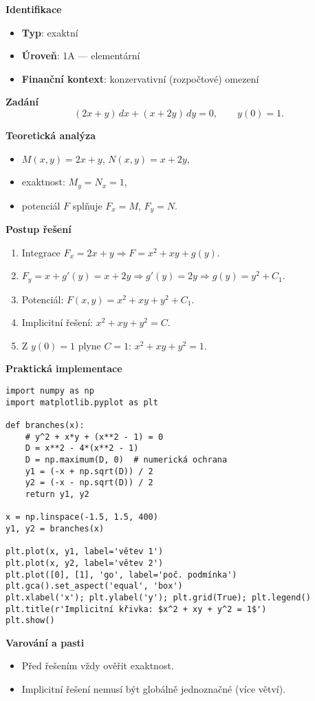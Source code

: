 \begin{example}
\label{ex:1a6}

\textbf{Identifikace}
\begin{itemize}
\item \textbf{Typ}: exaktní
\item \textbf{Úroveň}: 1A — elementární
\item \textbf{Finanční kontext}: konzervativní (rozpočtové) omezení
\end{itemize}

\textbf{Zadání}
\[
(2x+y)\,dx + (x+2y)\,dy = 0, \qquad y(0)=1.
\]

\textbf{Teoretická analýza}
\begin{itemize}
\item $M(x,y)=2x+y$, $N(x,y)=x+2y$,
\item exaktnost: $M_y=N_x=1$,
\item potenciál $F$ splňuje $F_x=M$, $F_y=N$.
\end{itemize}

\textbf{Postup řešení}
\begin{enumerate}
\item Integrace $F_x=2x+y \Rightarrow F=x^2+xy+g(y)$.
\item $F_y = x + g'(y) = x + 2y \Rightarrow g'(y)=2y \Rightarrow g(y)=y^2 + C_1$.
\item Potenciál: $F(x,y)=x^2+xy+y^2 + C_1$.
\item Implicitní řešení: $x^2+xy+y^2 = C$.
\item Z $y(0)=1$ plyne $C=1$: $x^2+xy+y^2=1$.
\end{enumerate}

\textbf{Praktická implementace}
\begin{verbatim}
import numpy as np
import matplotlib.pyplot as plt

def branches(x):
    # y^2 + x*y + (x**2 - 1) = 0
    D = x**2 - 4*(x**2 - 1)
    D = np.maximum(D, 0)  # numerická ochrana
    y1 = (-x + np.sqrt(D)) / 2
    y2 = (-x - np.sqrt(D)) / 2
    return y1, y2

x = np.linspace(-1.5, 1.5, 400)
y1, y2 = branches(x)

plt.plot(x, y1, label='větev 1')
plt.plot(x, y2, label='větev 2')
plt.plot([0], [1], 'go', label='poč. podmínka')
plt.gca().set_aspect('equal', 'box')
plt.xlabel('x'); plt.ylabel('y'); plt.grid(True); plt.legend()
plt.title(r'Implicitní křivka: $x^2 + xy + y^2 = 1$')
plt.show()
\end{verbatim}

\textbf{Varování a pasti}
\begin{itemize}
\item Před řešením vždy ověřit exaktnost.
\item Implicitní řešení nemusí být globálně jednoznačné (více větví).
\end{itemize}
\end{example}


